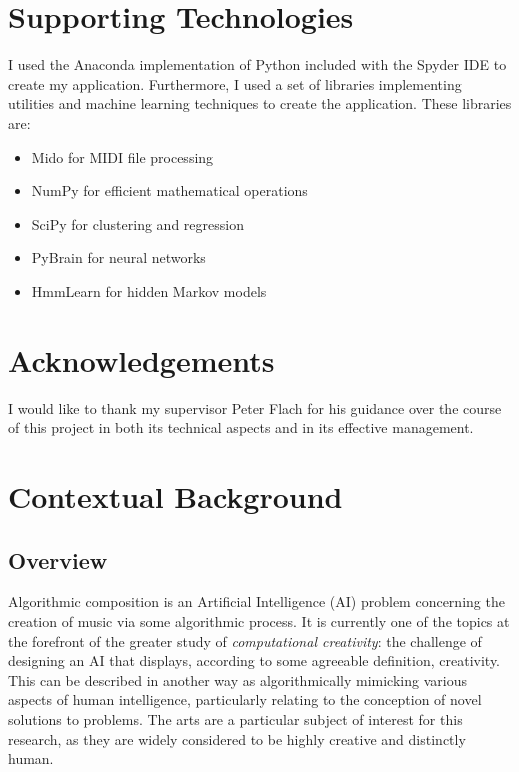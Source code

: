 \documentclass[ author={Stephen Livermore-Tozer},
				supervisor={Dr. Peter Flach},
				degree={MEng},
				title={Algorithmic Co-composition Using Machine Learning},
				subtitle={},
				type={research},
				year={2016} ]{dissertation}
\begin{document}
	\chapter*{Supporting Technologies}
	
	I used the Anaconda implementation of Python included with the Spyder IDE to create my application. Furthermore, I used a set of libraries implementing utilities and machine learning techniques to create the application. These libraries are: 
	
	\begin{itemize}
		\item Mido for MIDI file processing
		\item NumPy for efficient mathematical operations
		\item SciPy for clustering and regression
		\item PyBrain for neural networks
		\item HmmLearn for hidden Markov models
	\end{itemize}
	
	
	\chapter*{Acknowledgements}
	
	I would like to thank my supervisor Peter Flach for his guidance over the course of this project in both its technical aspects and in its effective management.
	
	\mainmatter
	
	
	\chapter{Contextual Background}
	\label{chap:context}
	
	\section{Overview}
	
	Algorithmic composition is an Artificial Intelligence (AI) problem concerning the creation of music via some algorithmic process. It is currently one of the topics at the forefront of the greater study of \textit{computational creativity}: the challenge of designing an AI that displays, according to some agreeable definition, creativity. This can be described in another way as algorithmically mimicking various aspects of human intelligence, particularly relating to the conception of novel solutions to problems. The arts are a particular subject of interest for this research, as they are widely considered to be highly creative and distinctly human.
	
\end{document}
